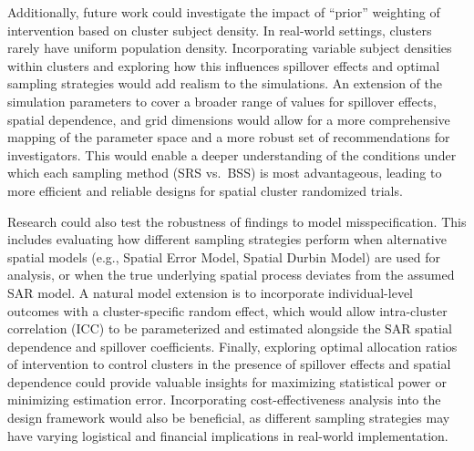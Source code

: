 \documentclass[
  12pt,
  prelim]{bios-prelim}
\begin{document}
Additionally, future work could investigate the impact of ``prior''
weighting of intervention based on cluster subject density. In
real-world settings, clusters rarely have uniform population density.
Incorporating variable subject densities within clusters and exploring
how this influences spillover effects and optimal sampling strategies
would add realism to the simulations. An extension of the simulation
parameters to cover a broader range of values for spillover effects,
spatial dependence, and grid dimensions would allow for a more
comprehensive mapping of the parameter space and a more robust set of
recommendations for investigators. This would enable a deeper
understanding of the conditions under which each sampling method (SRS
vs.~BSS) is most advantageous, leading to more efficient and reliable
designs for spatial cluster randomized trials.

Research could also test the robustness of findings to model
misspecification. This includes evaluating how different sampling
strategies perform when alternative spatial models (e.g., Spatial Error
Model, Spatial Durbin Model) are used for analysis, or when the true
underlying spatial process deviates from the assumed SAR model. A
natural model extension is to incorporate individual-level outcomes with
a cluster-specific random effect, which would allow intra-cluster
correlation (ICC) to be parameterized and estimated alongside the SAR
spatial dependence and spillover coefficients. Finally, exploring
optimal allocation ratios of intervention to control clusters in the
presence of spillover effects and spatial dependence could provide
valuable insights for maximizing statistical power or minimizing
estimation error. Incorporating cost-effectiveness analysis into the
design framework would also be beneficial, as different sampling
strategies may have varying logistical and financial implications in
real-world implementation.
\end{document}
